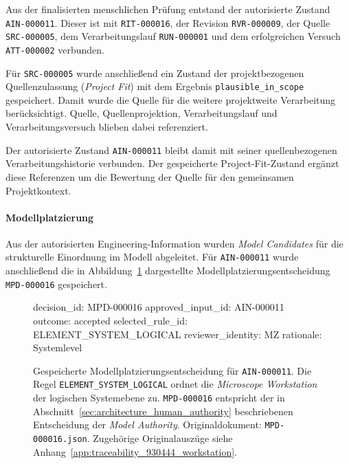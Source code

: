 Aus der finalisierten menschlichen Prüfung entstand der autorisierte Zustand
\texttt{AIN-000011}. Dieser ist mit \texttt{RIT-000016}, der Revision
\texttt{RVR-000009}, der Quelle \texttt{SRC-000005}, dem
Verarbeitungslauf \texttt{RUN-000001} und dem erfolgreichen Versuch
\texttt{ATT-000002} verbunden.

Für \texttt{SRC-000005} wurde anschließend ein Zustand der
projektbezogenen Quellenzulassung (\emph{Project Fit}) mit dem Ergebnis
\texttt{plausible\_in\_scope} gespeichert. Damit wurde die Quelle für die
weitere projektweite Verarbeitung berücksichtigt. Quelle,
Quellenprojektion, Verarbeitungslauf und Verarbeitungsversuch blieben dabei
referenziert.

Der autorisierte Zustand \texttt{AIN-000011} bleibt damit mit seiner
quellenbezogenen Verarbeitungshistorie verbunden. Der gespeicherte
Project-Fit-Zustand ergänzt diese Referenzen um die Bewertung der Quelle für
den gemeinsamen Projektkontext.

\paragraph{Modellplatzierung}

Aus der autorisierten Engineering-Information wurden
\emph{Model Candidates} für die strukturelle Einordnung im Modell
abgeleitet. Für \texttt{AIN-000011} wurde anschließend die in
Abbildung~\ref{fig:result_930444_placement} dargestellte
Modellplatzierungsentscheidung \texttt{MPD-000016} gespeichert.

\begin{figure}[htbp]
    \centering
    \begin{minipage}{0.94\textwidth}
        \begin{evidencebox}
decision_id:       MPD-000016
approved_input_id: AIN-000011
outcome:           accepted
selected_rule_id:  ELEMENT_SYSTEM_LOGICAL
reviewer_identity: MZ
rationale:         Systemlevel
        \end{evidencebox}
    \end{minipage}
    \caption[Modellplatzierungsentscheidung]{
    Gespeicherte Modellplatzierungsentscheidung für
    \texttt{AIN-000011}. Die Regel
    \texttt{ELEMENT\_SYSTEM\_LOGICAL} ordnet die
    \emph{Microscope Workstation} der logischen Systemebene zu.
    \texttt{MPD-000016} entspricht der in
    Abschnitt~\ref{sec:architecture_human_authority} beschriebenen
    Entscheidung der \emph{Model Authority}. Originaldokument:
    \texttt{MPD-000016.json}. Zugehörige Originalauszüge siehe
    Anhang~\ref{app:traceability_930444_workstation}.}
    \label{fig:result_930444_placement}
\end{figure}

